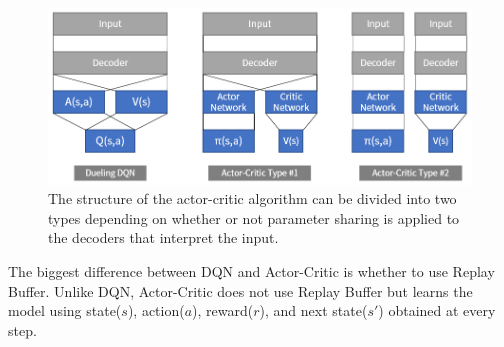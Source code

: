 \begin{figure}[h]
\centering
\includegraphics[scale=0.618]{pix/sac/rl4_0.png}
\caption{The structure of the actor-critic algorithm can be divided into 
two types depending on whether or not parameter sharing is applied to 
the decoders that interpret the input.}
\label{fig:two_types_actor_critic}
\end{figure}

The biggest difference between DQN and Actor-Critic is whether to use 
Replay Buffer. Unlike DQN, Actor-Critic does not use Replay Buffer but 
learns the model using state($s$), action($a$), reward($r$), and next 
state($s'$) obtained at every step.

